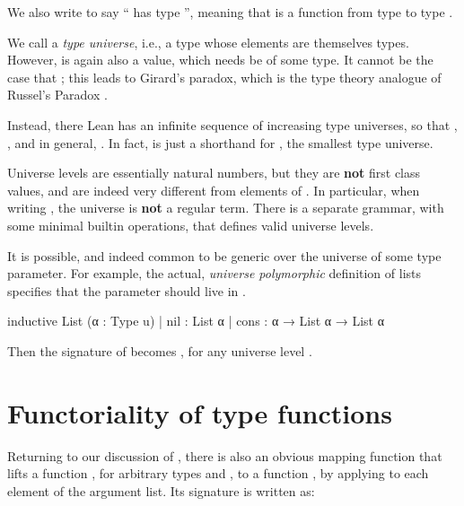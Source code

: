 \begin{remark}
    We also write  to say `` has type '', meaning that  is a function from type  to type .
\end{remark}

We call \Type{} a \emph{type universe}, i.e., a type whose elements are themselves types. However, \Type{} is again also a value, which needs be of some type.
It cannot be the case that ; this leads to Girard's paradox, which is the type theory analogue of Russel's Paradox \cite{girardInterpretationFonctionelleElimination1972}.

Instead, there Lean has an infinite sequence of increasing type universes, so that , , and in general, . In fact,  is just a shorthand for , the smallest type universe.

Universe levels  are essentially natural numbers, but they are \textbf{not} first class values, and are indeed very different from elements of .
In particular, when writing , the universe  is \textbf{not} a regular term. There is a separate grammar, with some minimal builtin operations, that defines valid universe levels.

It is possible, and indeed common to be generic over the universe of some type parameter. For example, the actual, \emph{universe polymorphic} definition of lists specifies that the parameter  should live in .
\begin{leancode}
    inductive List (α : Type u)
    | nil  : List α
    | cons : α → List α → List α
\end{leancode}

Then the signature of  becomes , for any universe level .

\section{Functoriality of type functions}

Returning to our discussion of , there is also an obvious mapping function that lifts a function , for arbitrary types  and , to a function , by applying  to each element of the argument list. Its signature is written as:
\begin{center}
\end{center}

